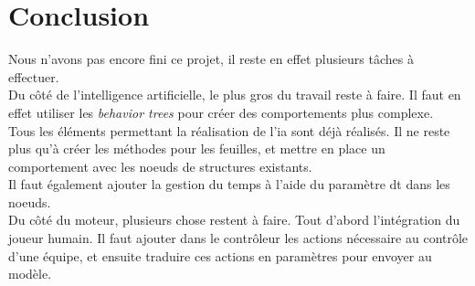 \section{Conclusion}


Nous n'avons pas encore fini ce projet, il reste en effet plusieurs tâches à effectuer.\\

Du côté de l'intelligence artificielle, le plus gros du travail reste à faire. Il faut en effet utiliser les \textit{behavior trees} pour créer des comportements plus complexe.\\
Tous les éléments permettant la réalisation de l'ia sont déjà réalisés. Il ne reste plus qu'à créer les méthodes pour les feuilles, et mettre en place un comportement avec les noeuds de structures existants.\\
Il faut également ajouter la gestion du temps à l'aide du paramètre dt dans les noeuds.\\


Du côté du moteur, plusieurs chose restent à faire.
Tout d'abord l'intégration du joueur humain. Il faut ajouter dans le contrôleur les actions nécessaire au contrôle d'une équipe, et ensuite traduire ces actions en paramètres pour envoyer au modèle.